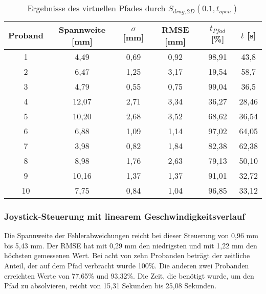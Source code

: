 \begin{table}[htb]
	\caption{Ergebnisse des virtuellen Pfades durch $S_{drag,2D}(0.1,t_{open})$}
	\label{table pfad v d}
	\begin{center}
		\begin{tabular}{|c|c|c|c|c|c|}
			\hline 
			Proband & Spannweite [mm] & $\sigma$ [mm] & RMSE [mm] & $t_{Pfad}$ [\%] & $t$ [s] \\ 
			\hline 	
			1 & 4,49 & 0,69 & 0,92 & 98,91 & 43,8  \\ 
			\hline
			2 & 6,47 & 1,25 & 3,17 & 19,54 & 58,7  \\ 
			\hline
			3 & 4,79 & 0,55 & 0,75 & 99,04 & 36,5  \\ 
			\hline 
			4 & 12,07 & 2,71 & 3,34 & 36,27 & 28,46  \\ 
			\hline 
			5 & 10,20 & 2,68 & 3,52 & 68,62 & 36,54  \\ 
			\hline 
			6 & 6,88 & 1,09 & 1,14 & 97,02 & 64,05  \\ 
			\hline 
			7 & 3,98 & 0,82 & 1,84 & 82,38 & 62,38  \\ 
			\hline 
			8 & 8,98 & 1,76 & 2,63 & 79,13 & 50,10  \\ 
			\hline 
			9 & 10,16 & 1,37 & 1,37 & 91,01 & 32,72  \\ 
			\hline 
			10 & 7,75 & 0,84 & 1,04 & 96,85 & 33,12  \\ 
			\hline 
		\end{tabular} 
	\end{center}
\end{table}

\subsubsection{Joystick-Steuerung mit linearem Geschwindigkeitsverlauf}
Die Spannweite der Fehlerabweichungen reicht bei dieser Steuerung von 0,96 mm bis 5,43 mm. Der RMSE hat mit 0,29 mm den niedrigsten und mit 1,22 mm den höchsten gemessenen Wert. Bei acht von zehn Probanden beträgt der zeitliche Anteil, der auf dem Pfad verbracht wurde 100\%. Die anderen zwei Probanden erreichten Werte von 77,65\% und 93,32\%. Die Zeit, die benötigt wurde, um den Pfad zu absolvieren, reicht von 15,31 Sekunden bis 25,08 Sekunden.

